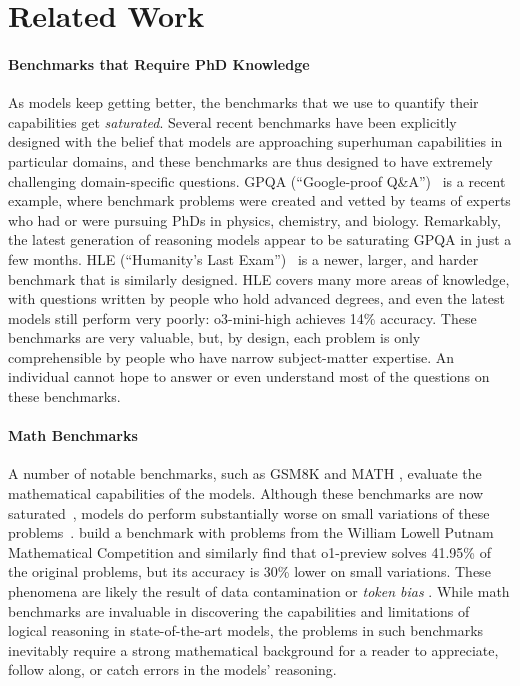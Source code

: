 \section{Related Work}
\paragraph{Benchmarks that Require PhD Knowledge}

As models keep getting better, the benchmarks that we use to quantify their capabilities get \emph{saturated}. Several recent benchmarks have been explicitly designed with the belief that models are approaching superhuman capabilities in particular domains, and these benchmarks are thus designed to have extremely challenging domain-specific questions. GPQA (``Google-proof Q\&A'')~\citep{gpqa} is a recent example, where benchmark problems were created and vetted by teams of experts who had or were pursuing PhDs in physics, chemistry, and biology. Remarkably, the latest generation of reasoning models appear to be saturating GPQA in just a few months. HLE (``Humanity's Last Exam'')~\citep{phan:humanitys-last-exam} is a newer, larger, and harder benchmark that is similarly designed. HLE covers many more areas of knowledge, with questions written by people who hold advanced degrees, and even the latest models still perform very poorly: o3-mini-high achieves 14\% accuracy. These benchmarks are very valuable, but, by design, each problem is only comprehensible by people who have narrow subject-matter expertise. An individual cannot hope to answer or even understand most of the questions on these benchmarks.

\paragraph{Math Benchmarks}
A number of notable benchmarks, 
such as GSM8K \citep{cobbe:gsm8k} and MATH \citep{hendrycks_math2021},
evaluate the mathematical capabilities of the models. Although these benchmarks are now saturated~\citep{lei2024,zhong2024}, models do perform substantially worse on small variations of these problems~\cite{mirzadeh2024pre}.
\cite{gulati2024} build a benchmark with problems from the William Lowell Putnam Mathematical Competition and similarly find that o1-preview solves 41.95\% of the original problems, but its accuracy is 30\% lower on small variations. These phenomena are likely the result of data contamination or \textit{token bias} \citep{jiang_tokbias2024pre}.
While math benchmarks are invaluable in discovering the capabilities and limitations of logical reasoning in state-of-the-art models, the problems in such benchmarks inevitably require a strong mathematical background for a reader to appreciate, follow along, or catch errors in the models' reasoning.

